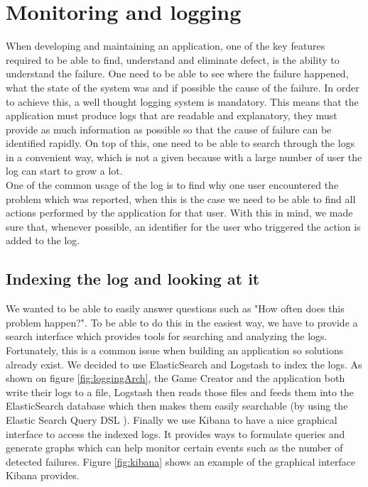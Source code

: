 \section{Monitoring and logging}\label{sec:logging}
When developing and maintaining an application, one of the key features required to be able to find, understand and eliminate defect, is the ability to understand the failure. One need to be able to see where the failure happened, what the state of the system was and if possible the cause of the failure. In order to achieve this, a well thought logging system is mandatory. This means that the application must produce logs that are readable and explanatory, they must provide as much information as possible so that the cause of failure can be identified rapidly. On top of this, one need to be able to search through the logs in a convenient way, which is not a given because with a large number of user the log can start to grow a lot.\\
One of the common usage of the log is to find why one user encountered the problem which was reported, when this is the case we need to be able to find all actions performed by the application for that user. With this in mind, we made sure that, whenever possible, an identifier for the user who triggered the action is added to the log.
\subsection{Indexing the log and looking at it}
We wanted to be able to easily answer questions such as "How often does this problem happen?". To be able to do this in the easiest way, we have to provide a search interface which provides tools for searching and analyzing the logs. Fortunately, this is a common issue when building an application so solutions already exist. We decided to use ElasticSearch\cite{elasticsearch} and Logstash\cite{logstash} to index the logs. As shown on figure \ref{fig:loggingArch}, the Game Creator and the application both write their logs to a file, Logstash then reads those files and feeds them into the ElasticSearch database which then makes them easily searchable (by using the Elastic Search Query DSL \cite{querydsl}). Finally we use Kibana\cite{kibana} to have a nice graphical interface to access the indexed logs. It provides ways to formulate queries and generate graphs which can help monitor certain events such as the number of detected failures. Figure \ref{fig:kibana} shows an example of the graphical interface Kibana provides.

